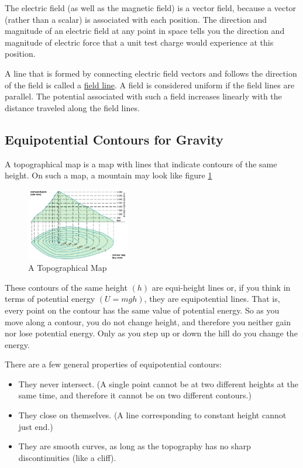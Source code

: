 The electric field (as well as the magnetic field) is a vector field, because a vector (rather than a scalar) is associated with each position. The direction and magnitude of an electric field at any point in space tells you the direction and magnitude of electric force that a  unit test charge would experience at this position. \myskip

A line that is formed by connecting electric field vectors and follows the direction of the field is called a \underline{field line}. A field is considered uniform if the field lines are parallel. The potential associated with such a field increases linearly with the distance traveled along the field lines.

\subsection{Equipotential Contours for Gravity}

A topographical map is a map with lines that indicate contours of the same height. On such a map, a mountain may look like figure \ref{fig:topograph}

\begin{figure}[h]
    \begin{center}
        \includegraphics[width=0.4\textwidth]{./Exp1/pic/contourmap.jpg}
    \end{center}
    \caption{A Topographical Map}
    \label{fig:topograph}
\end{figure}

These contours of the same height $(h)$ are equi-height lines or, if you think in terms of potential energy $(U = mgh)$, they are equipotential lines. That is, every point on the contour has the same value of potential energy. So as you move along a contour, you do not change height, and therefore you neither gain nor lose potential energy. Only as you step up or down the hill do you change the energy. \myskip

There are a few general properties of equipotential contours:
\begin{itemize}
    \item They never intersect. (A single point cannot be at two different heights at the same time, and
therefore it cannot be on two different contours.)
    \item They close on themselves. (A line corresponding to constant height cannot just end.)
    \item They are smooth curves, as long as the topography has no sharp discontinuities (like a cliff).
\end{itemize}

